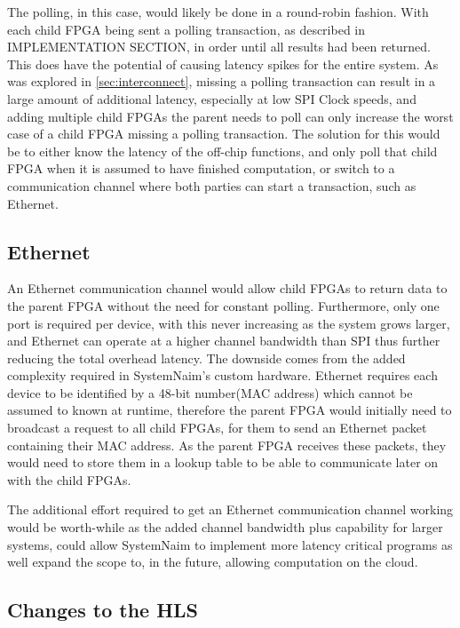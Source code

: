 The polling, in this case, would likely be done in a round-robin fashion. With each child FPGA being sent a polling transaction, as described in IMPLEMENTATION SECTION, in order until all results had been returned. This does have the potential of causing latency spikes for the entire system. As was explored in \autoref{sec:interconnect}, missing a polling transaction can result in a large amount of additional latency, especially at low SPI Clock speeds, and adding multiple child FPGAs the parent needs to poll can only increase the worst case of a child FPGA missing a polling transaction. The solution for this would be to either know the latency of the off-chip functions, and only poll that child FPGA when it is assumed to have finished computation, or switch to a communication channel where both parties can start a transaction, such as Ethernet.

\subsection{Ethernet}

An Ethernet communication channel would allow child FPGAs to return data to the parent FPGA without the need for constant polling. Furthermore, only one port is required per device, with this never increasing as the system grows larger, and Ethernet can operate at a higher channel bandwidth than SPI thus further reducing the total overhead latency. The downside comes from the added complexity required in SystemNaim's custom hardware. Ethernet requires each device to be identified by a 48-bit number(MAC address) which cannot be assumed to known at runtime, therefore the parent FPGA would initially need to broadcast a request to all child FPGAs, for them to send an Ethernet packet containing their MAC address. As the parent FPGA receives these packets, they would need to store them in a lookup table to be able to communicate later on with the child FPGAs.

The additional effort required to get an Ethernet communication channel working would be worth-while as the added channel bandwidth plus capability for larger systems, could allow SystemNaim to implement more latency critical programs as well expand the scope to, in the future, allowing computation on the cloud.

\subsection{Changes to the HLS}

